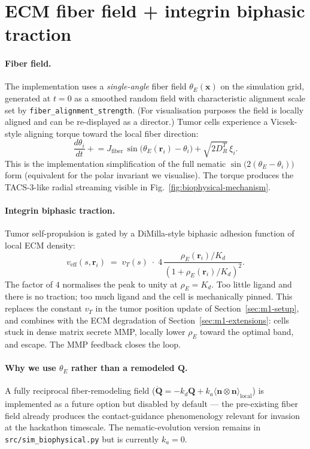 \documentclass[11pt,letterpaper]{article}
\begin{document}
\section{ECM fiber field + integrin biphasic traction}
\label{sec:m2-fibers}

\paragraph{Fiber field.}
The implementation uses a \emph{single-angle} fiber field
$\theta_E(\mathbf{x})$ on the simulation grid, generated at $t=0$ as a
smoothed random field with characteristic alignment scale set by
\texttt{fiber\_alignment\_strength}. (For visualisation purposes the
field is locally aligned and can be re-displayed as a director.) Tumor
cells experience a Vicsek-style aligning torque toward the local fiber
direction:
\begin{equation}
\boxed{\;
\frac{d\theta_i}{dt} \mathrel{+}\!= J_{\text{fiber}}\,
   \sin\!\big(\theta_E(\mathbf{r}_i) - \theta_i\big)
   + \sqrt{2 D_R^T}\,\xi_i.
\;}
\label{eq:fiber-align-implemented}
\end{equation}
This is the implementation simplification of the full nematic
$\sin\!\big(2(\theta_E - \theta_i)\big)$ form
(equivalent for the polar invariant we visualise). The torque produces
the TACS-3-like radial streaming visible in
Fig.~\ref{fig:biophysical-mechanism}.

\paragraph{Integrin biphasic traction.}
Tumor self-propulsion is gated by a DiMilla-style biphasic adhesion
function of local ECM density:
\begin{equation}
\boxed{\;
v_{\text{eff}}(s, \mathbf{r}_i) \;=\; v_T(s)\;\cdot\;
   4\,\frac{\rho_E(\mathbf{r}_i)/K_d}{(1 + \rho_E(\mathbf{r}_i)/K_d)^2}.
\;}
\label{eq:integrin-implemented}
\end{equation}
The factor of $4$ normalises the peak to unity at $\rho_E = K_d$. Too
little ligand and there is no traction; too much ligand and the cell is
mechanically pinned. This replaces the constant $v_T$ in the tumor
position update of Section~\ref{sec:m1-setup}, and combines with the ECM
degradation of Section~\ref{sec:m1-extensions}: cells stuck in dense
matrix secrete MMP, locally lower $\rho_E$ toward the optimal band, and
escape. The MMP feedback closes the loop.

\paragraph{Why we use $\theta_E$ rather than a remodeled $\mathbf{Q}$.}
A fully reciprocal fiber-remodeling field
($\dot{\mathbf{Q}} = -k_d \mathbf{Q} + k_a\langle \mathbf{n}\otimes\mathbf{n}\rangle_{\text{local}}$)
is implemented as a future option but disabled by default --- the
pre-existing fiber field already produces the contact-guidance
phenomenology relevant for invasion at the hackathon timescale. The
nematic-evolution version remains in
\texttt{src/sim\_biophysical.py} but is currently $k_a = 0$.
\end{document}
